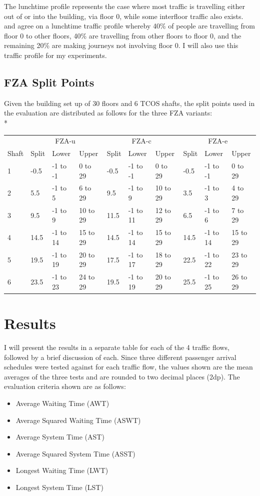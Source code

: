 \documentclass{UoYCSproject}
\begin{document}
The lunchtime profile represents the case where most traffic is travelling either out of or into the building, via floor 0, while some interfloor traffic also exists.  \citet{Rong2003} and \citet{Siikonen1993} agree on a lunchtime traffic profile whereby 40\% of people are travelling from floor 0 to other floors, 40\% are travelling from other floors to floor 0, and the remaining 20\% are making journeys not involving floor 0.  I will also use this traffic profile for my experiments.

\subsection{FZA Split Points}

Given the building set up of 30 floors and 6 TCOS shafts, the split points used in the evaluation are distributed as follows for the three FZA variants:\\*
\begin{tabular}{l || l | l | l || l | l | l || l | l | l}
		& \multicolumn{3}{c||}{FZA-u} & \multicolumn{3}{c||}{FZA-c} & \multicolumn{3}{c}{FZA-e} \\
	Shaft & Split & Lower & Upper & Split & Lower & Upper & Split & Lower & Upper \\
	\hline
	1	& -0.5	& -1 to -1	& 0 to 29	& -0.5	& -1 to -1	& 0 to 29	& -0.5	& -1 to -1	& 0 to 29 \\
	2	& 5.5	& -1 to 5	& 6 to 29	& 9.5	& -1 to 9	& 10 to 29	& 3.5	& -1 to 3	& 4 to 29 \\
	3	& 9.5	& -1 to 9	& 10 to 29	& 11.5	& -1 to 11	& 12 to 29	& 6.5	& -1 to 6	& 7 to 29 \\
	4	& 14.5	& -1 to 14	& 15 to 29	& 14.5	& -1 to 14	& 15 to 29	& 14.5	& -1 to 14	& 15 to 29 \\
	5	& 19.5	& -1 to 19	& 20 to 29	& 17.5	& -1 to 17	& 18 to 29	& 22.5	& -1 to 22	& 23 to 29 \\
	6	& 23.5	& -1 to 23	& 24 to 29	& 19.5	& -1 to 19	& 20 to 29	& 25.5	& -1 to 25	& 26 to 29
\end{tabular}

\section{Results}
\label{tcosresults}

I will present the results in a separate table for each of the 4 traffic flows, followed by a brief discussion of each.  Since three different passenger arrival schedules were tested against for each traffic flow, the values shown are the mean averages of the three tests and are rounded to two decimal places (2dp).  The evaluation criteria shown are as follows:
\begin{itemize}
	\item Average Waiting Time (AWT)
	\item Average Squared Waiting Time (ASWT)
	\item Average System Time (AST)
	\item Average Squared System Time (ASST)
	\item Longest Waiting Time (LWT)
	\item Longest System Time (LST)
\end{itemize}
\end{document}
